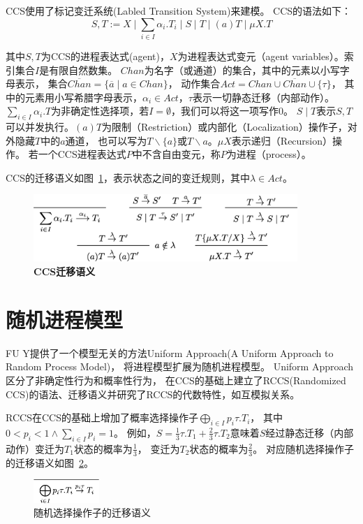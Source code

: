    CCS使用了标记变迁系统(Labled Transition System)来建模。
   CCS的语法如下：
   \begin{equation}
    S,T:=X\mid \sum_{i\in I}\alpha_i.T_i\mid S\mid T \mid (a)T \mid \mu X.T
   \end{equation}

   其中$S,T$为CCS的进程表达式(agent)，$X$为进程表达式变元（agent variables）。索引集合$I$是有限自然数集。
   $Chan$为名字（或通道）的集合，其中的元素以小写字母表示，
   集合$\overline{Chan}=\{\overline{a}\mid a\in Chan\}$，
   动作集合$Act=Chan\cup \overline{Chan}\cup \{\tau\} $，
   其中的元素用小写希腊字母表示，$\alpha_i\in Act$，$\tau$表示一切静态迁移（内部动作）。
   $\sum_{i\in I}\alpha_i.T$为非确定性选择项，若$I=\emptyset$，我们可以将这一项写作$0$。
   $S\mid T$表示$S,T$可以并发执行。$(a)T$为限制（Restriction）或内部化（Localization）操作子，对外隐藏$T$中的$a$通道，
   也可以写为$T\backslash \{a\}$或$T\backslash a$。$\mu X$表示递归（Recursion）操作。
   若一个CCS进程表达式$P$中不含自由变元，称$P$为进程（process）。

   CCS的迁移语义如图~\ref{fig_ccs}，表示状态之间的变迁规则，其中$\lambda \in Act$。
   \begin{figure}[!htbp]
    \small
    \centering
    \includegraphics[width=10cm]{../figures/ccs.png}
    \caption[]{\textbf{CCS迁移语义}}
     \label{fig_ccs}
 \end{figure}
   \section{随机进程模型}

   FU Y提供了一个模型无关的方法Uniform Approach(A Uniform Approach to Random Process Model)\cite{Fu_UniformApproach}，
   将进程模型扩展为随机进程模型。
   Uniform Approach区分了非确定性行为和概率性行为，
   在CCS的基础上建立了RCCS(Randomized CCS)的语法、迁移语义并研究了RCCS的代数特性，如互模拟关系。

   RCCS在CCS的基础上增加了概率选择操作子$\bigoplus_{i\in I}p_i\tau.T_i$，
   其中$0<p_i<1 \wedge \sum_{i\in I}p_i = 1$。
   例如，$S=\frac{1}{3}\tau.T_1+\frac{2}{3}\tau.T_2$意味着$S$经过静态迁移（内部动作）变迁为$T_1$状态的概率为$\frac{1}{3}$，
   变迁为$T_2$状态的概率为$\frac{2}{3}$。
  对应随机选择操作子的迁移语义如图~\ref{fig_rccs}。
   \begin{figure}[!htbp]
    \small
    \centering
    \includegraphics[width=2.5cm]{../figures/rccs.png}
    \caption[]{随机选择操作子的迁移语义}
     \label{fig_rccs}
 \end{figure}

